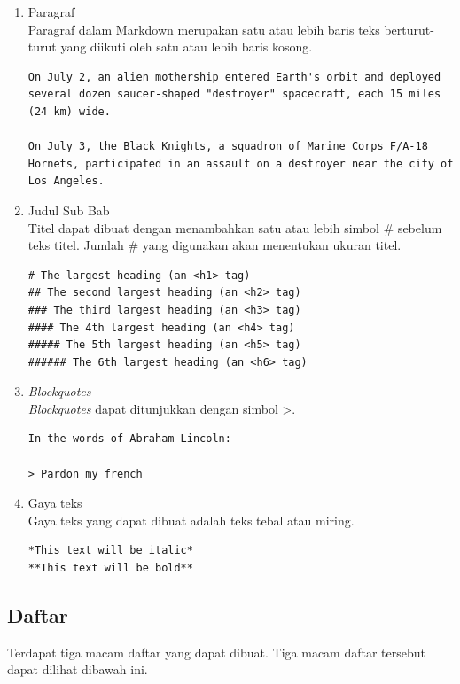 \begin{enumerate}
\item Paragraf\\
Paragraf dalam Markdown merupakan satu atau lebih baris teks berturut-turut yang diikuti oleh satu atau lebih baris kosong.
\begin{lstlisting}
On July 2, an alien mothership entered Earth's orbit and deployed several dozen saucer-shaped "destroyer" spacecraft, each 15 miles (24 km) wide.

On July 3, the Black Knights, a squadron of Marine Corps F/A-18 Hornets, participated in an assault on a destroyer near the city of Los Angeles.
\end{lstlisting}
\item Judul Sub Bab\\
Titel dapat dibuat dengan menambahkan satu atau lebih simbol \# sebelum teks titel. Jumlah \# yang digunakan akan menentukan ukuran titel.
\begin{lstlisting}
# The largest heading (an <h1> tag)
## The second largest heading (an <h2> tag)
### The third largest heading (an <h3> tag)
#### The 4th largest heading (an <h4> tag)
##### The 5th largest heading (an <h5> tag)
###### The 6th largest heading (an <h6> tag)
\end{lstlisting}
\item {\it Blockquotes}\\
{\it Blockquotes} dapat ditunjukkan dengan simbol >.
\begin{lstlisting}
In the words of Abraham Lincoln:

> Pardon my french
\end{lstlisting}
\item Gaya teks\\
Gaya teks yang dapat dibuat adalah teks tebal atau miring.
\begin{lstlisting}
*This text will be italic*
**This text will be bold**
\end{lstlisting}
\end{enumerate}

\subsection{Daftar}
Terdapat tiga macam daftar yang dapat dibuat. Tiga macam daftar tersebut dapat dilihat dibawah ini.

